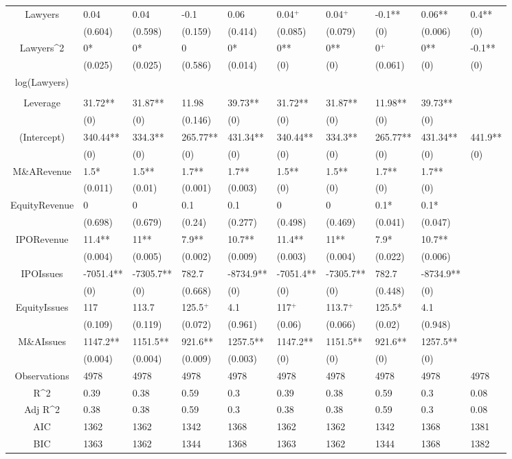 \documentclass{article}
\begin{document}
\begin{table}[H]
\begin{tabular}{|clllllllll|}
Lawyers & 0.04 & 0.04 & -0.1 & 0.06 & 0.04$^{+}$ & 0.04$^{+}$ & -0.1** & 0.06** & 0.4** \\ 
   & (0.604) & (0.598) & (0.159) & (0.414) & (0.085) & (0.079) & (0) & (0.006) & (0) \\ 
  Lawyers^2 & 0* & 0* & 0 & 0* & 0** & 0** & 0$^{+}$ & 0** & -0.1** \\ 
   & (0.025) & (0.025) & (0.586) & (0.014) & (0) & (0) & (0.061) & (0) & (0) \\ 
  log(Lawyers) &  &  &  &  &  &  &  &  &  \\ 
   &  &  &  &  &  &  &  &  &  \\ 
  Leverage & 31.72** & 31.87** & 11.98 & 39.73** & 31.72** & 31.87** & 11.98** & 39.73** &  \\ 
   & (0) & (0) & (0.146) & (0) & (0) & (0) & (0) & (0) &  \\ 
  (Intercept) & 340.44** & 334.3** & 265.77** & 431.34** & 340.44** & 334.3** & 265.77** & 431.34** & 441.9** \\ 
   & (0) & (0) & (0) & (0) & (0) & (0) & (0) & (0) & (0) \\ 
  M\&ARevenue & 1.5* & 1.5** & 1.7** & 1.7** & 1.5** & 1.5** & 1.7** & 1.7** &  \\ 
   & (0.011) & (0.01) & (0.001) & (0.003) & (0) & (0) & (0) & (0) &  \\ 
  EquityRevenue & 0 & 0 & 0.1 & 0.1 & 0 & 0 & 0.1* & 0.1* &  \\ 
   & (0.698) & (0.679) & (0.24) & (0.277) & (0.498) & (0.469) & (0.041) & (0.047) &  \\ 
  IPORevenue & 11.4** & 11** & 7.9** & 10.7** & 11.4** & 11** & 7.9* & 10.7** &  \\ 
   & (0.004) & (0.005) & (0.002) & (0.009) & (0.003) & (0.004) & (0.022) & (0.006) &  \\ 
  IPOIssues & -7051.4** & -7305.7** & 782.7 & -8734.9** & -7051.4** & -7305.7** & 782.7 & -8734.9** &  \\ 
   & (0) & (0) & (0.668) & (0) & (0) & (0) & (0.448) & (0) &  \\ 
  EquityIssues & 117 & 113.7 & 125.5$^{+}$ & 4.1 & 117$^{+}$ & 113.7$^{+}$ & 125.5* & 4.1 &  \\ 
   & (0.109) & (0.119) & (0.072) & (0.961) & (0.06) & (0.066) & (0.02) & (0.948) &  \\ 
  M\&AIssues & 1147.2** & 1151.5** & 921.6** & 1257.5** & 1147.2** & 1151.5** & 921.6** & 1257.5** &  \\ 
   & (0.004) & (0.004) & (0.009) & (0.003) & (0) & (0) & (0) & (0) &  \\ 
  \hline 
 Observations & 4978 & 4978 & 4978 & 4978 & 4978 & 4978 & 4978 & 4978 & 4978 \\ 
  R^2 & 0.39 & 0.38 & 0.59 & 0.3 & 0.39 & 0.38 & 0.59 & 0.3 & 0.08 \\ 
  Adj R^2 & 0.38 & 0.38 & 0.59 & 0.3 & 0.38 & 0.38 & 0.59 & 0.3 & 0.08 \\ 
  AIC & 1362 & 1362 & 1342 & 1368 & 1362 & 1362 & 1342 & 1368 & 1381 \\ 
  BIC & 1363 & 1362 & 1344 & 1368 & 1363 & 1362 & 1344 & 1368 & 1382 \\ 
   \hline
\end{tabular}
 

\end{table}
\end{document}
